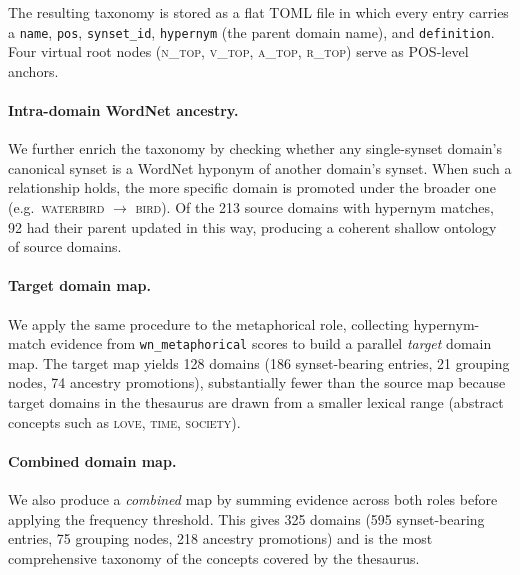 \documentclass[11pt,a4paper]{article}
\begin{document}
The resulting taxonomy is stored as a flat TOML file in which every entry
carries a \texttt{name}, \texttt{pos}, \texttt{synset\_id}, \texttt{hypernym}
(the parent domain name), and \texttt{definition}.
Four virtual root nodes (\textsc{n\_top}, \textsc{v\_top}, \textsc{a\_top},
\textsc{r\_top}) serve as POS-level anchors.

\paragraph{Intra-domain WordNet ancestry.}
We further enrich the taxonomy by checking whether any single-synset
domain's canonical synset is a WordNet hyponym of another domain's synset.
When such a relationship holds, the more specific domain is promoted under
the broader one (e.g.\ \textsc{waterbird} $\to$ \textsc{bird}).
Of the 213 source domains with hypernym matches, 92 had their parent
updated in this way, producing a coherent shallow ontology of source domains.

\paragraph{Target domain map.}
We apply the same procedure to the metaphorical role, collecting hypernym-match
evidence from \texttt{wn\_metaphorical} scores to build a parallel
\emph{target} domain map.
The target map yields 128 domains (186 synset-bearing entries, 21 grouping nodes,
74 ancestry promotions), substantially fewer than the source map because
target domains in the thesaurus are drawn from a smaller lexical range
(abstract concepts such as \textsc{love}, \textsc{time}, \textsc{society}).

\paragraph{Combined domain map.}
We also produce a \emph{combined} map by summing evidence across both roles
before applying the frequency threshold.
This gives 325 domains (595 synset-bearing entries, 75 grouping nodes,
218 ancestry promotions) and is the most comprehensive taxonomy of the
concepts covered by the thesaurus.
\end{document}
